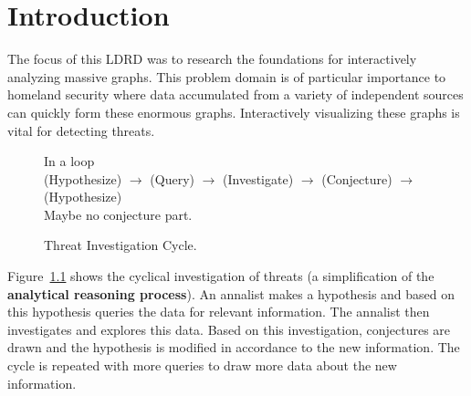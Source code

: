 \documentclass[pdf,12pt,report,strict]{SANDreport}
\newcommand*{\keyterm}[1]{\textbf{#1}}
\begin{document}


% 
\SANDmain		%

\chapter{Introduction}
\label{chap:Introduction}

The focus of this LDRD was to research the foundations for interactively
analyzing massive graphs.  This problem domain is of particular importance
to homeland security where data accumulated from a variety of independent
sources can quickly form these enormous graphs.  Interactively visualizing
these graphs is vital for detecting threats.

\begin{figure}
  \centering
  In a loop \\
  (Hypothesize) $\rightarrow$ (Query) $\rightarrow$ (Investigate)
  $\rightarrow$ (Conjecture) $\rightarrow$ (Hypothesize)
  \\
  Maybe no conjecture part.
  \caption{Threat Investigation Cycle.}
  \label{fig:ThreatInvestigationCycle}
\end{figure}

Figure~\ref{fig:ThreatInvestigationCycle} shows the cyclical investigation
of threats (a simplification of the \keyterm{analytical reasoning
process}\cite{Thomas05}).  An annalist
makes a hypothesis and based on this hypothesis queries the data for
relevant information.  The annalist then investigates and explores this
data.  Based on this investigation, conjectures are drawn and the
hypothesis is modified in accordance to the new information.  The cycle is
repeated with more queries to draw more data about the new information.
\end{document}
